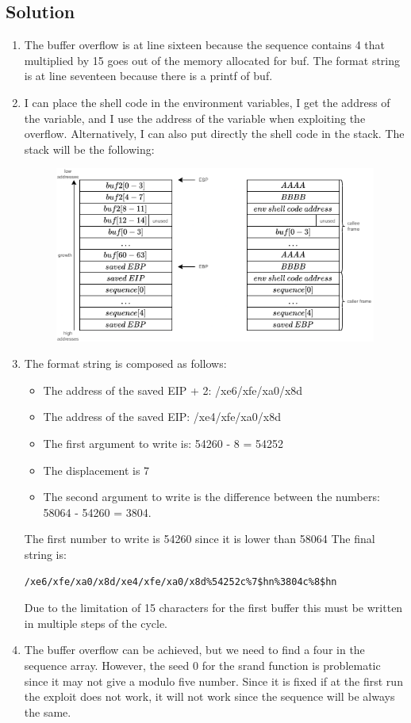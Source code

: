\subsection*{Solution}
\begin{enumerate}
    \item The buffer overflow is at line sixteen because the sequence contains 4 that multiplied by 15 goes out of the memory allocated for buf. 
        The format string is at line seventeen because there is a printf of buf. 
    \item I can place the shell code in the environment variables, I get the address of the variable, and I use the address of the variable when exploiting the overflow. 
        Alternatively, I can also put directly the shell code in the stack. 
        The stack will be the following: 
        \begin{figure}[H]
            \centering
            \includegraphics[width=0.75\linewidth]{images/stack9.png}
        \end{figure}
    \item The format string is composed as follows: 
        \begin{itemize}
            \item The address of the saved EIP + 2: /xe6/xfe/xa0/x8d
            \item The address of the saved EIP: /xe4/xfe/xa0/x8d
            \item The first argument to write is: 54260 - 8 = 54252
            \item The displacement is 7
            \item The second argument to write is the difference between the numbers: 58064 - 54260 = 3804.
        \end{itemize}
        The first number to write is 54260 since it is lower than 58064
        The final string is: 
\begin{verbatim}
/xe6/xfe/xa0/x8d/xe4/xfe/xa0/x8d%54252c%7$hn%3804c%8$hn
\end{verbatim}
        Due to the limitation of 15 characters for the first buffer this must be written in multiple steps of the cycle.
    \item The buffer overflow can be achieved, but we need to find a four in the sequence array. 
        However, the seed 0 for the srand function is problematic since it may not give a modulo five number. 
        Since it is fixed if at the first run the exploit does not work, it will not work since the sequence will be always the same. 
\end{enumerate}